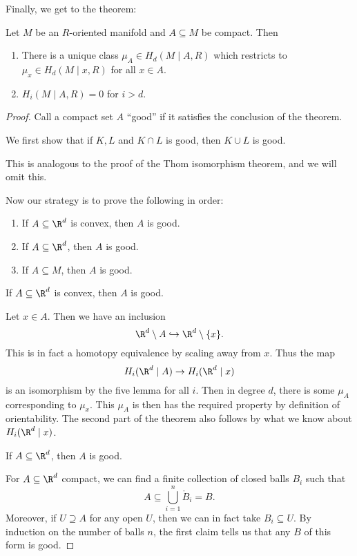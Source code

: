 \documentclass[a4paper]{article}
\begin{document}
Finally, we get to the theorem:
\begin{thm}
  Let $M$ be an $R$-oriented manifold and $A \subseteq M$ be compact. Then
  \begin{enumerate}
    \item There is a unique class $\mu_A \in H_d(M \mid A, R)$ which restricts to $\mu_x \in H_d(M \mid x, R)$ for all $x \in A$.
    \item $H_i(M\mid A, R) = 0$ for $i > d$.
  \end{enumerate}
\end{thm}

\begin{proof}
  Call a compact set $A$ ``good'' if it satisfies the conclusion of the theorem.

  \begin{claim}
    We first show that if $K, L$ and $K \cap L$ is good, then $K \cup L$ is good.
  \end{claim}
  This is analogous to the proof of the Thom isomorphism theorem, and we will omit this.

  Now our strategy is to prove the following in order:
  \begin{enumerate}
    \item If $A \subseteq \R^d$ is convex, then $A$ is good.
    \item If $A \subseteq \R^d$, then $A$ is good.
    \item If $A \subseteq M$, then $A$ is good.
  \end{enumerate}

  \begin{claim}
    If $A \subseteq \R^d$ is convex, then $A$ is good.
  \end{claim}
  Let $x \in A$. Then we have an inclusion
  \[
    \R^d \setminus A \hookrightarrow \R^d \setminus \{x\}.
  \]
  This is in fact a homotopy equivalence by scaling away from $x$. Thus the map
  \[
    H_i(\R^d \mid A) \to H_i(\R^d \mid x)
  \]
  is an isomorphism by the five lemma for all $i$. Then in degree $d$, there is some $\mu_A$ corresponding to $\mu_x$. This $\mu_A$ is then has the required property by definition of orientability. The second part of the theorem also follows by what we know about $H_i(\R^d \mid x)$.

  \begin{claim}
    If $A \subseteq \R^d$, then $A$ is good.
  \end{claim}
  For $A \subseteq \R^d$ compact, we can find a finite collection of closed balls $B_i$ such that
  \[
    A \subseteq \bigcup_{i = 1}^n \mathring{B}_i = B.
  \]
  Moreover, if $U \supseteq A$ for any open $U$, then we can in fact take $B_i \subseteq U$. By induction on the number of balls $n$, the first claim tells us that any $B$ of this form is good.


\end{proof}
\end{document}
